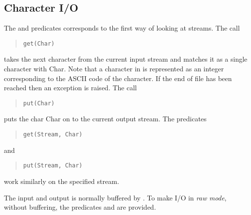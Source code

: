 \subsection{Character I/O}
The  and 
predicates corresponds to the first way
of looking at streams. The call\begin{quote}\begin{verbatim}
get(Char)\end{verbatim}\end{quote} takes the next character
from
the current input stream and matches it as a single character with Char.
Note that a character in {\eclipse} is represented as an integer corresponding
to the ASCII code of the character.
If the end of file has been reached then an exception is raised.
The call\begin{quote}\begin{verbatim}
put(Char)\end{verbatim}\end{quote} puts the char Char on to the current output
stream.
The predicates
\begin{quote}\begin{verbatim}
get(Stream, Char)\end{verbatim}\end{quote} and
\begin{quote}\begin{verbatim}
put(Stream, Char)\end{verbatim}\end{quote} work similarly on the specified stream.

The input and output is normally buffered by {\eclipse}.
To make I/O in {\it raw mode}, without buffering, the predicates
 and  are provided.

